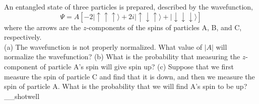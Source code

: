 An entangled state of three particles is prepared, described by the 
wavefunction,
\begin{equation*}
  \Psi = A\left[
     -2|\uparrow\uparrow\uparrow\rangle 
    +2i|\uparrow\downarrow\uparrow\rangle 
    +|\downarrow\downarrow\downarrow\rangle
  \right]
\end{equation*}
where the arrows are the $z$-components of the spins of particles A, B, and C, respectively.\\
%
(a) The wavefunction is not properly normalized.
What value of $|A|$ will normalize the wavefunction?\answercheck\hwendpart
%
(b) What is the probability that measuring the $z$-component of 
particle A's spin will give spin up?\answercheck\hwendpart
%
(c) Suppose that we first measure the spin of particle C and find that it is down,
and then we measure the spin of particle A. What is the probability that we will
find A's spin to be up?\answercheck\hwendpart
__shotwell
